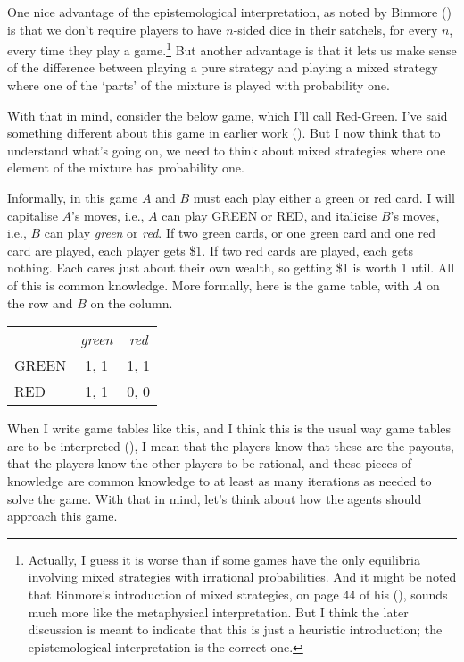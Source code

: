 \documentclass[
  10pt,
  letterpaper,
  DIV=11,
  numbers=noendperiod,
  twoside]{scrartcl}
\begin{document}
One nice advantage of the epistemological interpretation, as noted by
Binmore () is that we don't require
players to have \(n\)-sided dice in their satchels, for every \(n\),
every time they play a game.\footnote{Actually, I guess it is worse than
  if some games have the only equilibria involving mixed strategies with
  irrational probabilities. And it might be noted that Binmore's
  introduction of mixed strategies, on page 44 of his
  (), sounds much more like the
  metaphysical interpretation. But I think the later discussion is meant
  to indicate that this is just a heuristic introduction; the
  epistemological interpretation is the correct one.} But another
advantage is that it lets us make sense of the difference between
playing a pure strategy and playing a mixed strategy where one of the
`parts' of the mixture is played with probability one.

With that in mind, consider the below game, which I'll call Red-Green.
I've said something different about this game in earlier work
(). But I now
think that to understand what's going on, we need to think about mixed
strategies where one element of the mixture has probability one.

Informally, in this game \(A\) and \(B\) must each play either a green
or red card. I will capitalise \(A\)'s moves, i.e., \(A\) can play GREEN
or RED, and italicise \(B\)'s moves, i.e., \(B\) can play \emph{green}
or \emph{red}. If two green cards, or one green card and one red card
are played, each player gets \$1. If two red cards are played, each gets
nothing. Each cares just about their own wealth, so getting \$1 is worth
1 util. All of this is common knowledge. More formally, here is the game
table, with \(A\) on the row and \(B\) on the column.

\begin{longtable}[]{@{}lcc@{}}
\toprule\noalign{}
\endhead
\bottomrule\noalign{}
\endlastfoot
& \emph{green} & \emph{red} \\
GREEN & 1, 1 & 1, 1 \\
RED & 1, 1 & 0, 0 \\
\end{longtable}

When I write game tables like this, and I think this is the usual way
game tables are to be interpreted
(), I mean that
the players know that these are the payouts, that the players know the
other players to be rational, and these pieces of knowledge are common
knowledge to at least as many iterations as needed to solve the game.
With that in mind, let's think about how the agents should approach this
game.
\end{document}
